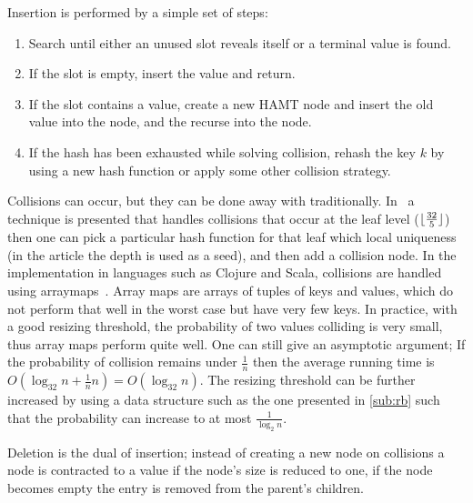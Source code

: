 Insertion is performed by a simple set of steps:
\begin{enumerate}
  \item Search until either an unused slot reveals itself or a terminal value is found.
  \item If the slot is empty, insert the value and return.
  \item If the slot contains a value, create a new HAMT node and insert the old value into the node, and the recurse into the node.
  \item If the hash has been exhausted while solving collision, rehash the key $k$ by using a new hash function or apply some other collision strategy.
\end{enumerate}
\begin{remark}
  Collisions can occur, but they can be done away with traditionally.
  In~\cite{bagwell2001ideal} a technique is presented that handles collisions that occur at the leaf level ($\lfloor\frac{32}{5}\rfloor$) then one can pick a particular hash function for that leaf which local uniqueness (in the article the depth is used as a seed), and then add a collision node.
  In the implementation in languages such as Clojure and Scala, collisions are handled using arraymaps~\cite{clojurehamt}.
  Array maps are arrays of tuples of keys and values, which do not perform that well in the worst case but have very few keys.
  In practice, with a good resizing threshold, the probability of two values colliding is very small, thus array maps perform quite well.
  One can still give an asymptotic argument; If the probability of collision remains under $\frac{1}{n}$ then the average running time is $O(\log_{32} n + \frac{1}{n}n) = O(\log_{32}n)$.
  The resizing threshold can be further increased by using a data structure such as the one presented in \autoref{sub:rb} such that the probability can increase to at most $\frac{1}{\log_2 n}$.
\end{remark}

Deletion is the dual of insertion; instead of creating a new node on collisions a node is contracted to a value if the node's size is reduced to one, if the node becomes empty the entry is removed from the parent's children.

